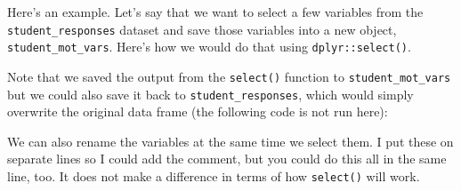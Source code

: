 \documentclass[]{book}
\newenvironment{Shaded}{\begin{snugshade}}{\end{snugshade}}
\newcommand{\KeywordTok}[1]{\textcolor[rgb]{0.13,0.29,0.53}{\textbf{#1}}}
\newcommand{\StringTok}[1]{\textcolor[rgb]{0.31,0.60,0.02}{#1}}
\newcommand{\CommentTok}[1]{\textcolor[rgb]{0.56,0.35,0.01}{\textit{#1}}}
\newcommand{\OperatorTok}[1]{\textcolor[rgb]{0.81,0.36,0.00}{\textbf{#1}}}
\newcommand{\NormalTok}[1]{#1}
\begin{document}
Here's an example. Let's say that we want to select a few variables from
the \texttt{student\_responses} dataset and save those variables into a
new object, \texttt{student\_mot\_vars}. Here's how we would do that
using \texttt{dplyr::select()}.

\begin{Shaded}
\end{Shaded}

Note that we saved the output from the \texttt{select()} function to
\texttt{student\_mot\_vars} but we could also save it back to
\texttt{student\_responses}, which would simply overwrite the original
data frame (the following code is not run here):

\begin{Shaded}
\end{Shaded}

We can also rename the variables at the same time we select them. I put
these on separate lines so I could add the comment, but you could do
this all in the same line, too. It does not make a difference in terms
of how \texttt{select()} will work.
\end{document}
